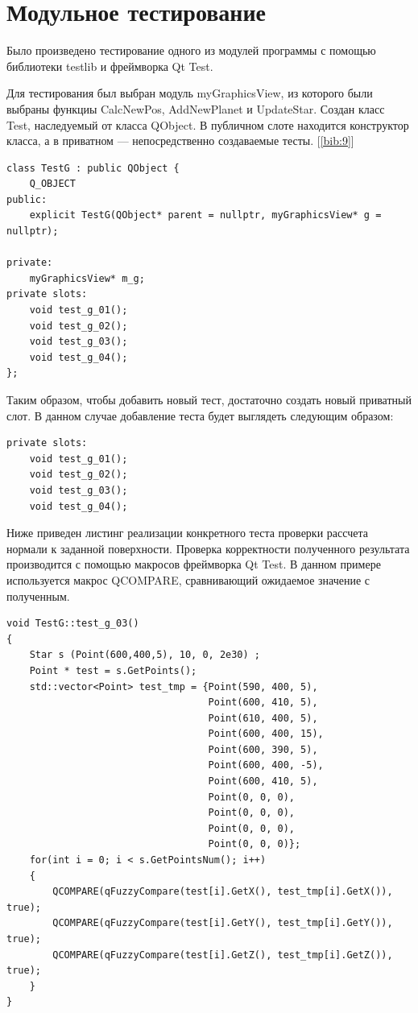    \section{Модульное тестирование}
    \par Было произведено тестирование одного из модулей программы с помощью 
библиотеки testlib и фреймворка Qt Test.
\par Для тестирования был выбран модуль myGraphicsView, из которого были выбраны 
функциы CalcNewPos, AddNewPlanet и UpdateStar. Создан класс Test, наследуемый от класса 
QObject. В публичном слоте находится конструктор класса, а в приватном —
непосредственно создаваемые тесты. [\ref{bib:9}]
\begin{lstlisting}[label=some-code,caption= Класс TestG для тестирования модуля Vector]
class TestG : public QObject {
    Q_OBJECT
public:
    explicit TestG(QObject* parent = nullptr, myGraphicsView* g = nullptr);

private:
    myGraphicsView* m_g;
private slots:
    void test_g_01();
    void test_g_02();
    void test_g_03();
    void test_g_04();
};
\end{lstlisting}
\par Таким образом, чтобы добавить новый тест, достаточно создать новый 
приватный слот. В данном случае добавление теста будет выглядеть следующим 
образом:
\begin{lstlisting}[label=some-code,caption= пример добавления нового модульного теста]
private slots:
    void test_g_01();
    void test_g_02();
    void test_g_03();
    void test_g_04();
\end{lstlisting}
\par Ниже приведен листинг реализации конкретного теста проверки рассчета нормали к заданной поверхности. Проверка корректности полученного результата производится с помощью макросов фреймворка Qt Test. В данном примере используется макрос 
QCOMPARE, сравнивающий ожидаемое значение с полученным.
\begin{lstlisting}[label=some-code,caption= реализация модульного теста test\_g\_03]
void TestG::test_g_03()
{
    Star s (Point(600,400,5), 10, 0, 2e30) ;
    Point * test = s.GetPoints();
    std::vector<Point> test_tmp = {Point(590, 400, 5),
                                   Point(600, 410, 5),
                                   Point(610, 400, 5),
                                   Point(600, 400, 15),
                                   Point(600, 390, 5),
                                   Point(600, 400, -5),
                                   Point(600, 410, 5),
                                   Point(0, 0, 0),
                                   Point(0, 0, 0),
                                   Point(0, 0, 0),
                                   Point(0, 0, 0)};
    for(int i = 0; i < s.GetPointsNum(); i++)
    {
        QCOMPARE(qFuzzyCompare(test[i].GetX(), test_tmp[i].GetX()), true);
        QCOMPARE(qFuzzyCompare(test[i].GetY(), test_tmp[i].GetY()), true);
        QCOMPARE(qFuzzyCompare(test[i].GetZ(), test_tmp[i].GetZ()), true);
    }
}
\end{lstlisting}

